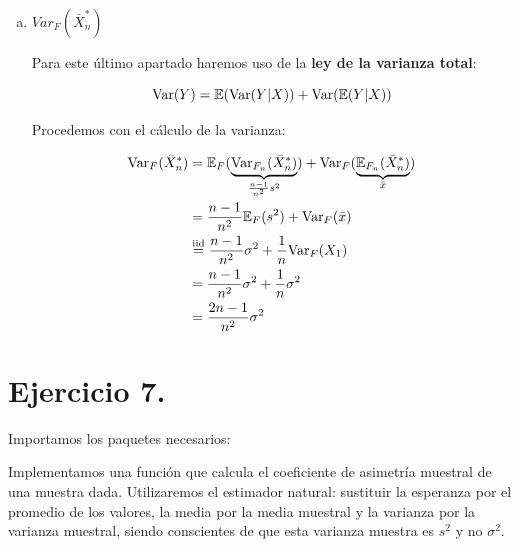 \documentclass[a4paper]{article}
\begin{document}
\begin{enumerate}[a)]
	\item $Var_{F}(\bar X_n^*)$
	
	Para este último apartado haremos uso de la \textbf{ley de la varianza total}:
	
	\[
		\text{Var}(Y) = \mathbb{E}(\text{Var}(Y|X)) + \text{Var}(\mathbb{E}(Y|X))
	\]
	
	Procedemos con el cálculo de la varianza:
	
	\[
		\begin{split}
			\text{Var}_{F}(\bar X_n^*) & = \mathbb{E}_{F}( \underbrace{\text{Var}_{F_n}(\bar X^*_n)}_{\frac{n-1}{n^2} s^2} ) + \text{Var}_{F}( \underbrace{\mathbb{E}_{F_n}(\bar X^*_n)}_{\bar x} )\\
			& = \frac{n-1}{n^2} \mathbb{E}_{F}(s^2) + \text{Var}_{F}( \bar x ) \\
			& \stackrel{\text{iid}}{=} \frac{n-1}{n^2} \sigma^2 + \frac{1}{n} \text{Var}_{F}(X_1)  \\
			& = \frac{n-1}{n^2} \sigma^2 + \frac{1}{n} \sigma^2 \\
			& = \frac{2n-1}{n^2} \sigma^2 \\
		\end{split}
	\]
	
\end{enumerate}

\section*{Ejercicio 7.}

Importamos los paquetes necesarios:

\begin{Shaded}
	\begin{Highlighting}[]
		\NormalTok{(}\NormalTok{())}
	\end{Highlighting}
\end{Shaded}

Implementamos una función que calcula el coeficiente de asimetría
muestral de una muestra dada. Utilizaremos el estimador natural:
sustituir la esperanza por el promedio de los valores, la media por la
media muestral y la varianza por la varianza muestral, siendo
conscientes de que esta varianza muestra es \(s^2\) y no \(\sigma^2\).

\begin{Shaded}
	\begin{Highlighting}[]
		\StringTok{ }
		\StringTok{ }
		\StringTok{ }
		\OperatorTok{-}\StringTok{ }\OperatorTok{^} \OperatorTok{/}\StringTok{ }
		\NormalTok{\}}
	\end{Highlighting}
\end{Shaded}
\end{document}

